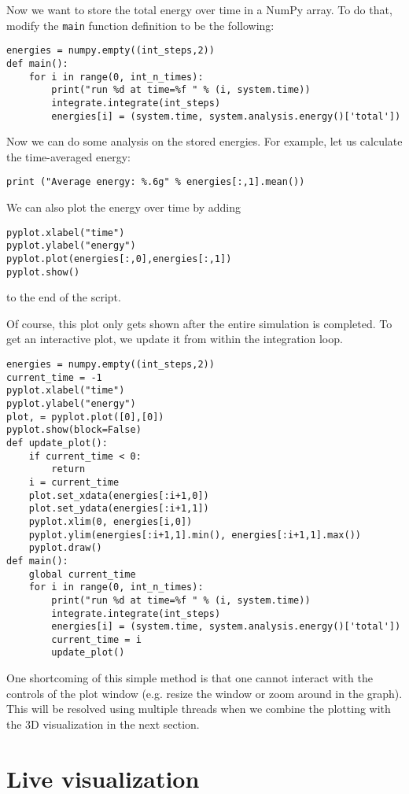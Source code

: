 \documentclass[
paper=a4,                       %
fontsize=11pt,                  %
twoside,                        %
footsepline,                    %
headsepline,                    %
headinclude=false,              %
footinclude=false,              %
pagesize,                       %
]{scrartcl}
\begin{document}
Now we want to store the total energy over time in a NumPy array.
To do that, modify the \lstinline{main} function definition to be the following:
\begin{lstlisting}
energies = numpy.empty((int_steps,2))
def main():
    for i in range(0, int_n_times):
        print("run %d at time=%f " % (i, system.time))
        integrate.integrate(int_steps)
        energies[i] = (system.time, system.analysis.energy()['total'])
\end{lstlisting}
Now we can do some analysis on the stored energies.
For example, let us calculate the time-averaged energy:
\begin{lstlisting}
print ("Average energy: %.6g" % energies[:,1].mean())
\end{lstlisting}
We can also plot the energy over time by adding
\begin{lstlisting}
pyplot.xlabel("time")
pyplot.ylabel("energy")
pyplot.plot(energies[:,0],energies[:,1])
pyplot.show()
\end{lstlisting}
to the end of the script.

Of course, this plot only gets shown after the entire simulation is completed.
To get an interactive plot, we update it from within the integration loop.
\begin{lstlisting}
energies = numpy.empty((int_steps,2))
current_time = -1
pyplot.xlabel("time")
pyplot.ylabel("energy")
plot, = pyplot.plot([0],[0])
pyplot.show(block=False)
def update_plot():
    if current_time < 0:
        return
    i = current_time
    plot.set_xdata(energies[:i+1,0])
    plot.set_ydata(energies[:i+1,1])
    pyplot.xlim(0, energies[i,0])
    pyplot.ylim(energies[:i+1,1].min(), energies[:i+1,1].max())
    pyplot.draw()
def main():
    global current_time
    for i in range(0, int_n_times):
        print("run %d at time=%f " % (i, system.time))
        integrate.integrate(int_steps)
        energies[i] = (system.time, system.analysis.energy()['total'])
        current_time = i
        update_plot()
\end{lstlisting}

One shortcoming of this simple method is that one cannot interact with the controls of the plot window (e.g. resize the window or zoom around in the graph).
This will be resolved using multiple threads when we combine the plotting with the 3D visualization in the next section.

\section{Live visualization}
\label{vis}
\end{document}
